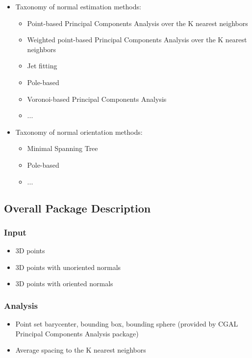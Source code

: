 \begin{itemize}
\item Taxonomy of normal estimation methods:

\begin{itemize}
\item Point-based Principal Components Analysis over the K nearest neighbors
\item Weighted point-based Principal Components Analysis over the K nearest neighbors
\item Jet fitting
\item Pole-based
\item Voronoi-based Principal Components Analysis
\item ...
\end{itemize}

\item Taxonomy of normal orientation methods:

\begin{itemize}
\item Minimal Spanning Tree \cite{cgal:hddms-srup-92}
\item Pole-based \cite{ABK98,BC02}
\item ...
\end{itemize}

\end{itemize}


\subsection{Overall Package Description}

\subsubsection{Input}

\begin{itemize}
\item 3D points
\item 3D points with unoriented normals
\item 3D points with oriented normals
\end{itemize}


\subsubsection{Analysis}

\begin{itemize}
\item Point set barycenter, bounding box, bounding sphere (provided by CGAL Principal Components Analysis package)
\item Average spacing to the K nearest neighbors
\end{itemize}


